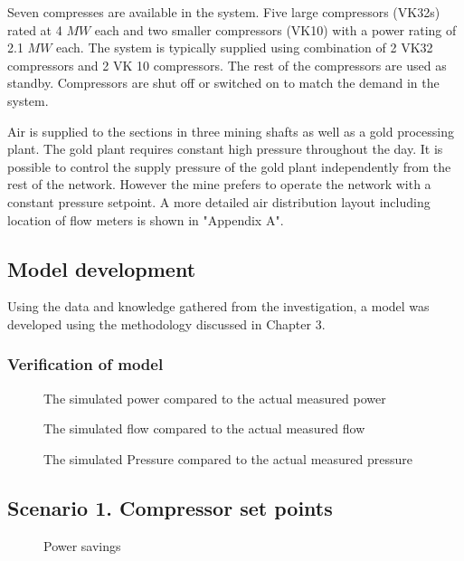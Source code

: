 Seven compresses are available in the system. Five large compressors (VK32s) rated at 4 $MW$ each and two smaller compressors (VK10) with a power rating of 2.1 $MW$ each. The system is typically supplied using combination of 2 VK32 compressors and 2 VK 10 compressors. The rest of the compressors are used as standby. Compressors are shut off or switched on  to match the demand in the system.  
\par
Air is supplied to the sections in three mining shafts as well as a gold processing plant. The gold plant requires constant high pressure throughout the day. It is possible to control the supply pressure of the gold plant independently from the rest of the network. However the mine prefers to operate the network with a constant pressure setpoint. A more detailed air distribution layout including location of flow meters is shown in "Appendix A". 
\subsection{Model development}
Using the data and knowledge gathered from  the investigation, a model was developed using the methodology discussed in Chapter 3.
\subsubsection{Verification of model}

\begin{figure}[h]
	\centering
	\fbox{}
	\caption{The simulated power compared to the actual measured power}
	\label{fig: Verification Power Beatrix}
\end{figure}

\begin{figure}[h]
	\centering
	\fbox{}
	\caption{The simulated flow compared to the actual measured flow}
	\label{fig: Verification Flow Beatrix}
\end{figure}

\begin{figure}[h]
	\centering
	\fbox{}
	\caption{The simulated Pressure compared to the actual measured pressure}
	\label{fig: Verification Pressure Beatrix}
\end{figure}

\subsection{Scenario 1. Compressor set points}
\begin{figure}[h!]
	\centering
	\fbox{}
	\caption{Power savings}
	\label{fig: CompSetpoints Results Beatrix}
\end{figure}

